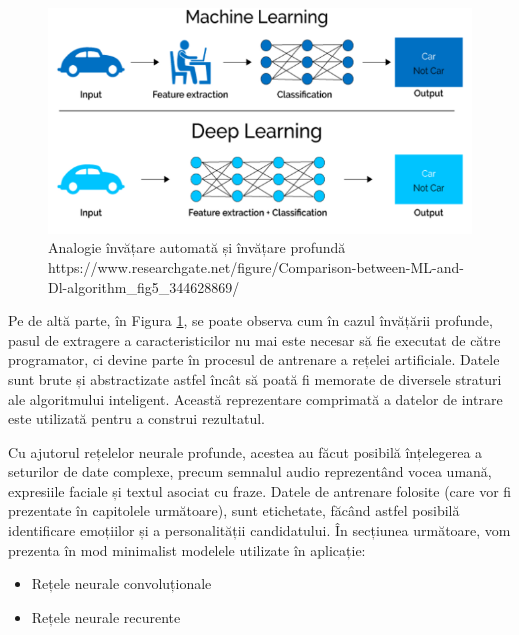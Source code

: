 \documentclass[a4paper, 12pt]{report}
\begin{document}
	\clearpage
	
	\begin{figure}[h]
		\begin{center}
			\includegraphics[scale=0.7]{images/ML_DL.png}
		\end{center}
		\caption{Analogie învățare automată și învățare profundă\newline
			\hspace{\linewidth}https://www.researchgate.net/figure/Comparison-between-ML-and-Dl-algorithm\_fig5\_344628869/}
		\label{fig:ML_DL}
	\end{figure}

	Pe de altă parte, în Figura \ref{fig:ML_DL}, se poate observa cum în cazul învățării profunde, pasul de extragere a caracteristicilor nu mai este necesar să fie executat de către programator, ci devine parte în procesul de antrenare a rețelei artificiale. Datele sunt brute și abstractizate astfel încât să poată fi memorate de diversele straturi ale algoritmului inteligent. Această reprezentare comprimată a datelor de intrare este utilizată pentru a construi rezultatul.

	Cu ajutorul rețelelor neurale profunde, acestea au făcut posibilă înțelegerea a seturilor de date complexe, precum semnalul audio reprezentând vocea umană, expresiile faciale și textul asociat cu fraze. Datele de antrenare folosite (care vor fi prezentate în capitolele următoare), sunt etichetate, făcând astfel posibilă identificare emoțiilor și a personalității candidatului. În secțiunea următoare, vom prezenta în mod minimalist modelele utilizate în aplicație:
	\begin{itemize}
		\item Rețele neurale convoluționale
		\item Rețele neurale recurente
	\end{itemize} 
\end{document}
